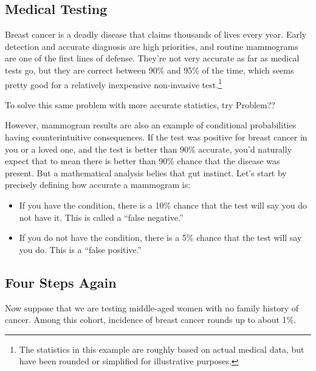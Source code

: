 \subsection{Medical Testing}\label{med_test-subsection}

Breast cancer is a deadly disease that claims thousands of lives every
year.  Early detection and accurate diagnosis are high priorities, and
routine mammograms are one of the first lines of defense.  They're not
very accurate as far as medical tests go, but they are correct between
90\% and 95\% of the time, which seems pretty good for a relatively
inexpensive non-invasive test.\footnote{The statistics in this example
  are roughly based on actual medical data, but have been rounded or
  simplified for illustrative purposes.}
\begin{editingnotes}
  To solve this same problem
  with more accurate statistics, try Problem??
\end{editingnotes}
However, mammogram results are also an example of conditional
probabilities having counterintuitive consequences.  If the test was
positive for breast cancer in you or a loved one, and the test is
better than 90\% accurate, you'd naturally expect that to mean there
is better than 90\% chance that the disease was present. But a
mathematical analysis belies that gut instinct.  Let's start by
precisely defining how accurate a mammogram is:
\begin{itemize}

\item If you have the condition, there is a 10\% chance that the test
  will say you do not have it.  This is called a ``false negative.''

\item If you do not have the condition, there is a 5\% chance that the
  test will say you do.  This is a ``false positive.''

\end{itemize}

\subsection{Four Steps Again}

Now suppose that we are testing middle-aged women with no family
history of cancer.  Among this cohort, incidence of breast cancer
rounds up to about 1\%.

